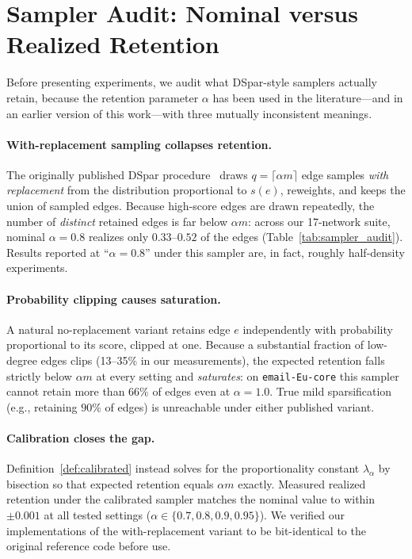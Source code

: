 \section{Sampler Audit: Nominal versus Realized Retention}
\label{sec:sampler}

Before presenting experiments, we audit what DSpar-style samplers actually retain, because the retention parameter $\alpha$ has been used in the literature---and in an earlier version of this work---with three mutually inconsistent meanings.

\paragraph{With-replacement sampling collapses retention.}
The originally published DSpar procedure~\cite{liu2023dspar} draws $q = \lceil \alpha m \rceil$ edge samples \emph{with replacement} from the distribution proportional to $s(e)$, reweights, and keeps the union of sampled edges.
Because high-score edges are drawn repeatedly, the number of \emph{distinct} retained edges is far below $\alpha m$: across our 17-network suite, nominal $\alpha = 0.8$ realizes only $0.33$--$0.52$ of the edges (Table~\ref{tab:sampler_audit}).
Results reported at ``$\alpha = 0.8$'' under this sampler are, in fact, roughly half-density experiments.

\paragraph{Probability clipping causes saturation.}
A natural no-replacement variant retains edge $e$ independently with probability proportional to its score, clipped at one.
Because a substantial fraction of low-degree edges clips (13--35\% in our measurements), the expected retention falls strictly below $\alpha m$ at every setting and \emph{saturates}: on \texttt{email-Eu-core} this sampler cannot retain more than $66\%$ of edges even at $\alpha = 1.0$.
True mild sparsification (e.g., retaining $90\%$ of edges) is unreachable under either published variant.

\paragraph{Calibration closes the gap.}
Definition~\ref{def:calibrated} instead solves for the proportionality constant $\lambda_\alpha$ by bisection so that expected retention equals $\alpha m$ exactly.
Measured realized retention under the calibrated sampler matches the nominal value to within $\pm 0.001$ at all tested settings ($\alpha \in \{0.7, 0.8, 0.9, 0.95\}$).
We verified our implementations of the with-replacement variant to be bit-identical to the original reference code before use.

